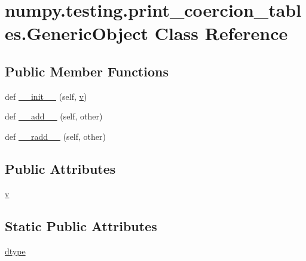 \hypertarget{classnumpy_1_1testing_1_1print__coercion__tables_1_1GenericObject}{}\section{numpy.\+testing.\+print\+\_\+coercion\+\_\+tables.\+Generic\+Object Class Reference}
\label{classnumpy_1_1testing_1_1print__coercion__tables_1_1GenericObject}
\subsection*{Public Member Functions}
\begin{DoxyCompactItemize}
\item 
def \hyperlink{classnumpy_1_1testing_1_1print__coercion__tables_1_1GenericObject_ab419b5680294545d41e88b73bb38cc09}{\+\_\+\+\_\+init\+\_\+\+\_\+} (self, \hyperlink{classnumpy_1_1testing_1_1print__coercion__tables_1_1GenericObject_a692813bc047199d66eaced71f66ae70c}{v})
\item 
def \hyperlink{classnumpy_1_1testing_1_1print__coercion__tables_1_1GenericObject_a492fab2c76b3c214815b25768f56ea96}{\+\_\+\+\_\+add\+\_\+\+\_\+} (self, other)
\item 
def \hyperlink{classnumpy_1_1testing_1_1print__coercion__tables_1_1GenericObject_ae55fd9435ea7d131df33b07bca3e9fe7}{\+\_\+\+\_\+radd\+\_\+\+\_\+} (self, other)
\end{DoxyCompactItemize}
\subsection*{Public Attributes}
\begin{DoxyCompactItemize}
\item 
\hyperlink{classnumpy_1_1testing_1_1print__coercion__tables_1_1GenericObject_a692813bc047199d66eaced71f66ae70c}{v}
\end{DoxyCompactItemize}
\subsection*{Static Public Attributes}
\begin{DoxyCompactItemize}
\item 
\hyperlink{classnumpy_1_1testing_1_1print__coercion__tables_1_1GenericObject_adb20d264463743bf0e0e2ced0e10f375}{dtype}
\end{DoxyCompactItemize}



